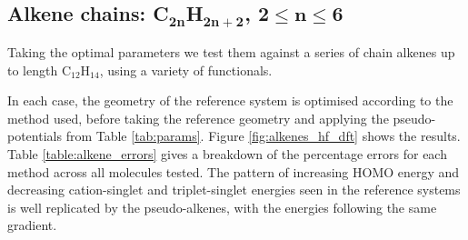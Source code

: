 \documentclass[aip,reprint]{revtex4-1}
\begin{document}
\subsection{Alkene chains: C\(\mathbf{_{2n}}\)H\(\mathbf{_{2n+2}}\), \(\mathbf{2 \leq n \leq 6}\)}

Taking the optimal parameters we test them against a series of chain alkenes up to
length C\(_{12}\)H\(_{14}\), using a variety of functionals.

In each case, the geometry of the reference system is optimised according to the method used,
before taking the reference geometry and applying the pseudo-potentials from Table \ref{tab:params}.
Figure \ref{fig:alkenes_hf_dft} shows the results.
Table \ref{table:alkene_errors} gives a breakdown of the percentage errors for each method
across all molecules tested.
The pattern of increasing HOMO energy and decreasing cation-singlet and triplet-singlet
energies seen in the reference systems is well replicated by the pseudo-alkenes,
with the energies following the same gradient.
\end{document}

